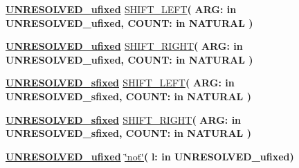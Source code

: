\begin{DoxyCompactItemize}
\item 
{\bfseries {\bfseries {\bfseries \hyperlink{classfixed__pkg_ae78bc2b36d22f6abeac163955e8a587d}{U\+N\+R\+E\+S\+O\+L\+V\+E\+D\+\_\+ufixed}} \textcolor{vhdlchar}{ }}} \hyperlink{classfixed__pkg_a2de27eedcaa3742451c07ee985b0686c}{S\+H\+I\+F\+T\+\_\+\+L\+E\+F\+T}{\bfseries  ( }{\bfseries \textcolor{vhdlchar}{A\+R\+G\+: }\textcolor{stringliteral}{in }\textcolor{vhdlchar}{U\+N\+R\+E\+S\+O\+L\+V\+E\+D\+\_\+ufixed}}{\bfseries  , \textcolor{vhdlchar}{C\+O\+U\+N\+T\+: }\textcolor{stringliteral}{in }{\bfseries \textcolor{comment}{N\+A\+T\+U\+R\+A\+L}\textcolor{vhdlchar}{ }}}{\bfseries  )} 
\item 
{\bfseries {\bfseries {\bfseries \hyperlink{classfixed__pkg_ae78bc2b36d22f6abeac163955e8a587d}{U\+N\+R\+E\+S\+O\+L\+V\+E\+D\+\_\+ufixed}} \textcolor{vhdlchar}{ }}} \hyperlink{classfixed__pkg_a4902245efcebf3b6e6566fdecdbe1332}{S\+H\+I\+F\+T\+\_\+\+R\+I\+G\+H\+T}{\bfseries  ( }{\bfseries \textcolor{vhdlchar}{A\+R\+G\+: }\textcolor{stringliteral}{in }\textcolor{vhdlchar}{U\+N\+R\+E\+S\+O\+L\+V\+E\+D\+\_\+ufixed}}{\bfseries  , \textcolor{vhdlchar}{C\+O\+U\+N\+T\+: }\textcolor{stringliteral}{in }{\bfseries \textcolor{comment}{N\+A\+T\+U\+R\+A\+L}\textcolor{vhdlchar}{ }}}{\bfseries  )} 
\item 
{\bfseries {\bfseries {\bfseries \hyperlink{classfixed__pkg_aa723b28a027c3c0f9bca02d75e8df4d6}{U\+N\+R\+E\+S\+O\+L\+V\+E\+D\+\_\+sfixed}} \textcolor{vhdlchar}{ }}} \hyperlink{classfixed__pkg_ae2ad89e91560b8c2ae7c0526eb1c1fa2}{S\+H\+I\+F\+T\+\_\+\+L\+E\+F\+T}{\bfseries  ( }{\bfseries \textcolor{vhdlchar}{A\+R\+G\+: }\textcolor{stringliteral}{in }\textcolor{vhdlchar}{U\+N\+R\+E\+S\+O\+L\+V\+E\+D\+\_\+sfixed}}{\bfseries  , \textcolor{vhdlchar}{C\+O\+U\+N\+T\+: }\textcolor{stringliteral}{in }{\bfseries \textcolor{comment}{N\+A\+T\+U\+R\+A\+L}\textcolor{vhdlchar}{ }}}{\bfseries  )} 
\item 
{\bfseries {\bfseries {\bfseries \hyperlink{classfixed__pkg_aa723b28a027c3c0f9bca02d75e8df4d6}{U\+N\+R\+E\+S\+O\+L\+V\+E\+D\+\_\+sfixed}} \textcolor{vhdlchar}{ }}} \hyperlink{classfixed__pkg_a5265a9d5e30365fb9abf08ca05c66687}{S\+H\+I\+F\+T\+\_\+\+R\+I\+G\+H\+T}{\bfseries  ( }{\bfseries \textcolor{vhdlchar}{A\+R\+G\+: }\textcolor{stringliteral}{in }\textcolor{vhdlchar}{U\+N\+R\+E\+S\+O\+L\+V\+E\+D\+\_\+sfixed}}{\bfseries  , \textcolor{vhdlchar}{C\+O\+U\+N\+T\+: }\textcolor{stringliteral}{in }{\bfseries \textcolor{comment}{N\+A\+T\+U\+R\+A\+L}\textcolor{vhdlchar}{ }}}{\bfseries  )} 
\item 
{\bfseries {\bfseries {\bfseries \hyperlink{classfixed__pkg_ae78bc2b36d22f6abeac163955e8a587d}{U\+N\+R\+E\+S\+O\+L\+V\+E\+D\+\_\+ufixed}} \textcolor{vhdlchar}{ }}} \hyperlink{classfixed__pkg_a419f38c947f75519afe49a7071378a43}{\char`\"{}not\char`\"{}}{\bfseries  ( }{\bfseries \textcolor{vhdlchar}{l\+: }\textcolor{stringliteral}{in }\textcolor{vhdlchar}{U\+N\+R\+E\+S\+O\+L\+V\+E\+D\+\_\+ufixed}}{\bfseries  )} 

\end{DoxyCompactItemize}
